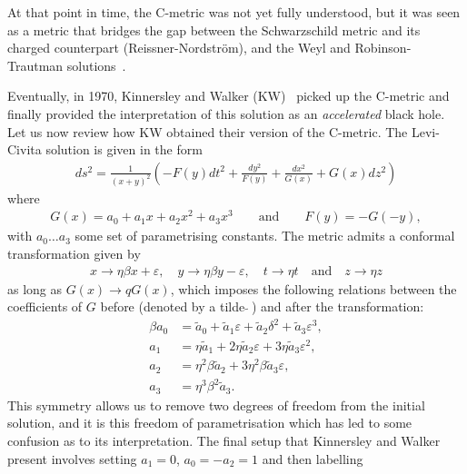 \documentclass[
twoside,
openright,
frontopenright,
]{dmathesis}
\newcommand{\ta}{\tilde{a}}
\begin{document}
At that point in time, the C-metric was not yet fully understood, but it was
seen as a metric that bridges the gap between the Schwarzschild metric and its
charged counterpart (Reissner-Nordstr\"om), and the Weyl and Robinson-Trautman
solutions~\cite{Kinnersley:1970zw}.

Eventually, in 1970, Kinnersley and Walker (KW)~\cite{Kinnersley:1970zw} picked
up the C-metric and finally provided the interpretation of this solution as an
\emph{accelerated} black hole. Let us now review how KW obtained their version
of the C-metric. The Levi-Civita solution is given in the form
\begin{align}
  \label{eq:levi-civita-metric}
  ds^2 = \frac{1}{(x+y)^2} \left(-F(y)dt^2 + \frac{dy^2}{F(y)} + \frac{dx^2}{G(x)}
  + G(x) dz^2\right)
\end{align}
where
\begin{align}
  G(x) = a_0 + a_1 x + a_2 x^2 + a_3 x^3 \qquad \mbox{and} \qquad F(y) = -G(-y),
\end{align}
with $a_0\ldots a_3$ some set of parametrising constants. The metric admits
a conformal transformation given by
\begin{gather}
  \label{eq:cmet-transf}
  x\to \eta\beta x + \varepsilon, \quad y \to \eta\beta y - \varepsilon, \quad t \to \eta t \quad \mbox{and} \quad
  z\to \eta z
\end{gather}
as long as $G(x) \to q G(x)$, which imposes the following relations between the
coefficients of $G$ before (denoted by a tilde $\tilde{}~$) and after the
transformation:
\begin{subequations}
  \label{eq:cmet-coef}
  \begin{align}
    \beta a_0 &= \ta_0 + \ta_1 \varepsilon+ \ta_ 2 \delta^2 + \ta_3 \varepsilon^3, \label{eq:cmet-coef1}\\
    a_1 &= \eta \ta_1 + 2\eta\ta_2 \varepsilon + 3 \eta\ta_3 \varepsilon^2, \label{eq:cmet-coef2}\\
    a_2 &= \eta^2\beta\ta_2 + 3 \eta^2\beta\ta_3\varepsilon, \label{eq:cmet-coef3}\\
    a_3 &= \eta^3\beta^2\ta_3.\label{eq:cmet-coef4}
  \end{align}
\end{subequations}
This symmetry allows us to remove two degrees of freedom from the initial
solution, and it is this freedom of parametrisation which has led to some
confusion as to its interpretation. The final setup that Kinnersley and Walker
present involves setting $a_1 = 0$, $a_0 = -a_2 = 1$ and then labelling
\end{document}
